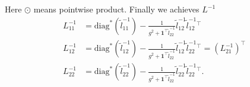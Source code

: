 \documentclass[final,onefignum,onetabnum]{siamart190516}
\begin{document}
Here $\odot$ means pointwise product. Finally we achieves $L^{-1}$
\begin{equation}\label{L_inv_formula}
    \begin{aligned}
        L^{-1}_{11} &= \text{diag}^*(\widetilde{l}^{-1}_{11}) - \frac{1}{g^2+\mathbf{1}^\top \widetilde{l}^{-1}_{22}}\widetilde{l}^{-1}_{12}\widetilde{l}^{-1}_{12}^\top\\
        L^{-1}_{12} &= \text{diag}^*(\widetilde{l}^{-1}_{12}) - \frac{1}{g^2+\mathbf{1}^\top \widetilde{l}^{-1}_{22}}\widetilde{l}^{-1}_{12}\widetilde{l}^{-1}_{22}^\top = (L^{-1}_{21})^{\top}\\
        L^{-1}_{22} &= \text{diag}^*(\widetilde{l}^{-1}_{22}) - \frac{1}{g^2+\mathbf{1}^\top \widetilde{l}^{-1}_{22}}\widetilde{l}^{-1}_{22}\widetilde{l}^{-1}_{22}^\top.
    \end{aligned}
\end{equation}
\end{document}

